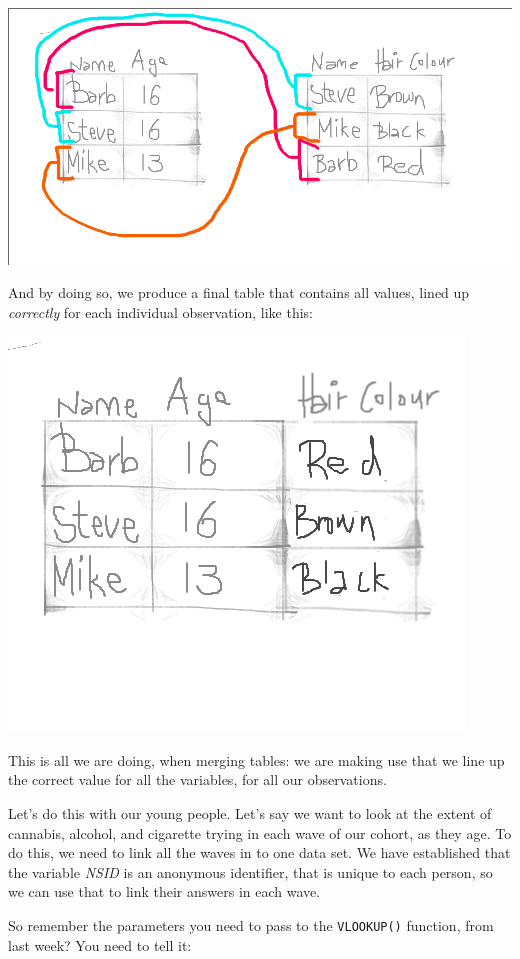 \documentclass[
]{book}
\begin{document}
\includegraphics{imgs/merge_logic_1.png}

And by doing so, we produce a final table that contains all values, lined up \emph{correctly} for each individual observation, like this:

\includegraphics{imgs/merge_logic_2.png}

This is all we are doing, when merging tables: we are making use that we line up the correct value for all the variables, for all our observations.

Let's do this with our young people. Let's say we want to look at the extent of cannabis, alcohol, and cigarette trying in each wave of our cohort, as they age. To do this, we need to link all the waves in to one data set. We have established that the variable \emph{NSID} is an anonymous identifier, that is unique to each person, so we can use that to link their answers in each wave.

So remember the parameters you need to pass to the \texttt{VLOOKUP()} function, from last week? You need to tell it:
\end{document}
